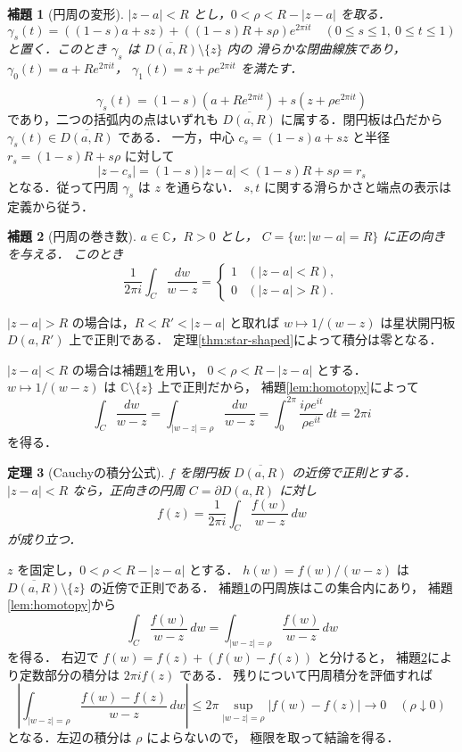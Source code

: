 \documentclass[a5paper,10pt,onecolumn]{jsarticle}
\makeatletter
\theoremstyle{mathnotetheorem}
\newtheorem{theorem}{定理}[section]
\newtheorem{lemma}[theorem]{補題}
\renewcommand{\proofname}{証明}
\renewenvironment{proof}[1][\proofname]{%
  \par\pushQED{\qed}\normalfont\topsep4\p@\@plus2\p@\relax
  \trivlist\item[\hskip\labelsep\bfseries #1]\ignorespaces
}{\popQED\endtrivlist\@endpefalse}
\makeatother
\begin{document}
\begin{lemma}[円周の変形]\label{lem:circle-deform}
$|z-a|<R$ とし，$0<\rho<R-|z-a|$ を取る．
\[
 \gamma_s(t)=((1-s)a+sz)
       +((1-s)R+s\rho)e^{2\pi it}
 \quad(0\le s\le1,\ 0\le t\le1)
\]
と置く．このとき $\gamma_s$ は
$\overline{D(a,R)}\setminus\{z\}$ 内の
滑らかな閉曲線族であり，
$\gamma_0(t)=a+Re^{2\pi it}$，
$\gamma_1(t)=z+\rho e^{2\pi it}$ を満たす．
\end{lemma}
\begin{proof}
\[
 \gamma_s(t)=(1-s)(a+Re^{2\pi it})+s(z+\rho e^{2\pi it})
\]
であり，二つの括弧内の点はいずれも
$\overline{D(a,R)}$ に属する．閉円板は凸だから
$\gamma_s(t)\in\overline{D(a,R)}$ である．
一方，中心 $c_s=(1-s)a+sz$ と半径
$r_s=(1-s)R+s\rho$ に対して
\[
 |z-c_s|=(1-s)|z-a|
 <(1-s)R+s\rho=r_s
\]
となる．従って円周 $\gamma_s$ は $z$ を通らない．
$s,t$ に関する滑らかさと端点の表示は定義から従う．
\end{proof}

\begin{lemma}[円周の巻き数]\label{lem:winding}
$a\in\mathbb C$，$R>0$ とし，
$C=\{w:|w-a|=R\}$ に正の向きを与える．
このとき
\[
 \frac1{2\pi i}\int_C\frac{dw}{w-z}
 =
 \begin{cases}
 1&(|z-a|<R),\\
 0&(|z-a|>R).
 \end{cases}
\]
\end{lemma}
\begin{proof}
$|z-a|>R$ の場合は，$R<R'<|z-a|$ と取れば
$w\mapsto1/(w-z)$ は星状開円板 $D(a,R')$ 上で正則である．
定理\ref{thm:star-shaped}によって積分は零となる．

$|z-a|<R$ の場合は補題\ref{lem:circle-deform}を用い，
$0<\rho<R-|z-a|$ とする．
$w\mapsto1/(w-z)$ は
$\mathbb C\setminus\{z\}$ 上で正則だから，
補題\ref{lem:homotopy}によって
\[
 \int_C\frac{dw}{w-z}
 =\int_{|w-z|=\rho}\frac{dw}{w-z}
 =\int_0^{2\pi}
   \frac{i\rho e^{it}}{\rho e^{it}}\,dt
 =2\pi i
\]
を得る．
\end{proof}

\begin{theorem}[Cauchyの積分公式]\label{thm:cauchy}
$f$ を閉円板 $\overline{D(a,R)}$ の近傍で正則とする．
$|z-a|<R$ なら，正向きの円周 $C=\partial D(a,R)$ に対し
\[
 f(z)=\frac1{2\pi i}\int_C\frac{f(w)}{w-z}\,dw
\]
が成り立つ．
\end{theorem}
\begin{proof}
$z$ を固定し，$0<\rho<R-|z-a|$ とする．
$h(w)=f(w)/(w-z)$ は
$\overline{D(a,R)}\setminus\{z\}$ の近傍で正則である．
補題\ref{lem:circle-deform}の円周族はこの集合内にあり，
補題\ref{lem:homotopy}から
\[
 \int_C\frac{f(w)}{w-z}\,dw
 =\int_{|w-z|=\rho}\frac{f(w)}{w-z}\,dw
\]
を得る．
右辺で $f(w)=f(z)+(f(w)-f(z))$ と分けると，
補題\ref{lem:winding}により定数部分の積分は
$2\pi i f(z)$ である．
残りについて円周積分を評価すれば
\[
 \left|\int_{|w-z|=\rho}
 \frac{f(w)-f(z)}{w-z}\,dw\right|
 \le2\pi\sup_{|w-z|=\rho}|f(w)-f(z)|
 \longrightarrow0\quad(\rho\downarrow0)
\]
となる．左辺の積分は $\rho$ によらないので，
極限を取って結論を得る．
\end{proof}
\end{document}
